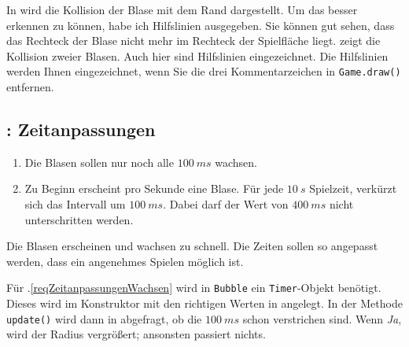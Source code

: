 
In  wird die Kollision der Blase mit dem Rand dargestellt. Um das besser erkennen zu können, habe ich Hilfslinien ausgegeben. Sie können gut sehen, dass das Rechteck der Blase nicht mehr im Rechteck der Spielfläche liegt.  zeigt die Kollision zweier Blasen. Auch hier sind Hilfslinien eingezeichnet. Die Hilfslinien werden Ihnen eingezeichnet, wenn Sie die drei Kommentarzeichen in \texttt{Game.draw()} entfernen.


\subsection{: Zeitanpassungen}
	\begin{enumerate}
		\item Die Blasen sollen nur noch alle $100~ms$ wachsen.\label{reqZeitanpassungenWachsen}
		\item Zu Beginn erscheint pro Sekunde eine Blase. Für jede $10~s$ Spielzeit, verkürzt sich das Intervall um $100~ms.$ Dabei darf der Wert von $400~ms$ nicht unterschritten werden.\label{reqZeitanpassungenErscheinen}
	\end{enumerate}
\er

Die Blasen erscheinen und wachsen zu schnell. Die Zeiten sollen so angepasst werden, dass ein angenehmes Spielen möglich ist. 

Für .\ref{reqZeitanpassungenWachsen} wird in \texttt{Bubble} ein \texttt{Timer}-Objekt benötigt. Dieses wird im Konstruktor mit den richtigen Werten in  angelegt. In der Methode \texttt{update()} wird dann in  abgefragt, ob die $100~ms$ schon verstrichen sind. Wenn \emph{Ja}, wird der Radius vergrößert; ansonsten passiert nichts.


